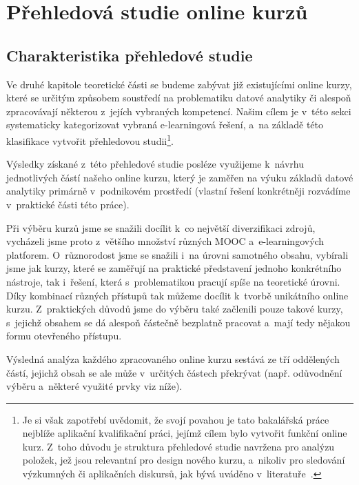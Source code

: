 \hypertarget{pux159ehledovuxe1-studie-online-kurzux16f}{%
\chapter{Přehledová studie online kurzů}\label{pux159ehledovuxe1-studie-online-kurzux16f}}

\hypertarget{charakteristika-pux159ehledovuxe9-studie}{%
\section{Charakteristika přehledové studie}\label{charakteristika-pux159ehledovuxe9-studie}}

Ve druhé kapitole teoretické části se budeme zabývat již existujícími online kurzy, které se určitým způsobem soustředí na problematiku datové analytiky či alespoň zpracovávají některou z~jejích vybraných kompetencí. Našim cílem je v~této sekci systematicky kategorizovat vybraná e-learningová řešení, a~na základě této klasifikace vytvořit přehledovou studii\footnote{Je si však zapotřebí uvědomit, že svojí povahou je tato bakalářská práce nejblíže aplikační kvalifikační práci, jejímž cílem bylo vytvořit funkční online kurz. Z~toho důvodu je struktura přehledové studie navržena pro analýzu položek, jež jsou relevantní pro design nového kurzu, a~nikoliv pro sledování výzkumných či aplikačních diskursů, jak bývá uváděno v~literatuře~\parencite{mares2013}.}.

Výsledky získané z~této přehledové studie posléze využijeme k~návrhu jednotlivých částí našeho online kurzu, který je zaměřen na výuku základů datové analytiky primárně v~podnikovém prostředí (vlastní řešení konkrétněji rozvádíme v~praktické části této práce).

Při výběru kurzů jsme se snažili docílit k~co největší diverzifikaci zdrojů, vycházeli jsme proto z~většího množství různých MOOC a~e-learningových platforem. O~různorodost jsme se snažili i~na úrovni samotného obsahu, vybírali jsme jak kurzy, které se zaměřují na praktické představení jednoho konkrétního nástroje, tak i~řešení, která s~problematikou pracují spíše na teoretické úrovni. Díky kombinací různých přístupů tak můžeme docílit k~tvorbě unikátního online kurzu. Z~praktických důvodů jsme do výběru také začlenili pouze takové kurzy, s~jejichž obsahem se dá alespoň částečně bezplatně pracovat a~mají tedy nějakou formu otevřeného přístupu.

Výsledná analýza každého zpracovaného online kurzu sestává ze tří oddělených částí, jejichž obsah se ale může v~určitých částech překrývat (např. odůvodnění výběru a~některé využité prvky viz níže).

